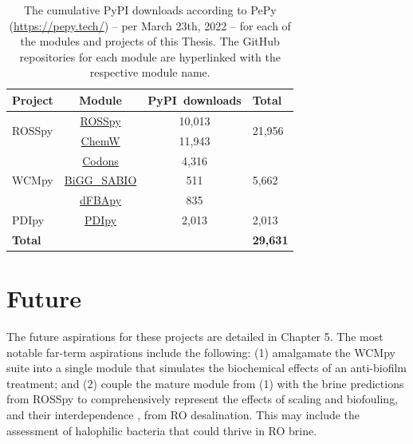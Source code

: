 \begin{table}
    \centering
    \begin{tabular}{l|c|c|l}
        \textbf{Project} & \textbf{Module} & \textbf{PyPI~downloads} & \textbf{Total}\\
        \toprule
        \multirow{2}{2mm}{ROSSpy} & \href{https://github.com/freiburgermsu/ROSSpy}{ROSSpy} & 10,013 & \multirow{2}{2mm}{21,956}\\
         & \href{https://github.com/freiburgermsu/ChemW}{ChemW} & 11,943 & \\
         \hline
        \multirow{3}{2mm}{WCMpy} & \href{https://github.com/freiburgermsu/Codons}{Codons} & 4,316 & \multirow{3}{2mm}{5,662}\\
         & \href{https://github.com/freiburgermsu/BiGG_SABIO}{BiGG\_SABIO}  & 511 & \\
         & \href{https://github.com/freiburgermsu/dFBApy}{dFBApy} & 835 & \\
         \hline
        PDIpy & \href{https://github.com/freiburgermsu/PDIpy}{PDIpy} & 2,013 & 2,013\\
         \hline
         \textbf{Total} &  &  & \textbf{29,631} \\
         \bottomrule
    \end{tabular}
    \caption{
        The cumulative PyPI downloads according to PePy (\url{https://pepy.tech/}) -- per March 23th, 2022 -- for each of the modules and projects of this Thesis. The GitHub repositories for each module are hyperlinked with the respective module name. 
    }
    \label{downloads}
\end{table}


\section{Future}
The future aspirations for these projects are detailed in Chapter 5. The most notable far-term aspirations include the following: (1) amalgamate the WCMpy suite into a single module that simulates the biochemical effects of an anti-biofilm treatment; and (2) couple the mature module from (1) with the brine predictions from ROSSpy to comprehensively represent the effects of scaling and biofouling, and their interdependence \cite{Radu2014ASystems,Radu2010ModelingPassage}, from RO desalination. This may include the assessment of halophilic bacteria \cite{Bagheri2019ARuber} that could thrive in RO brine.